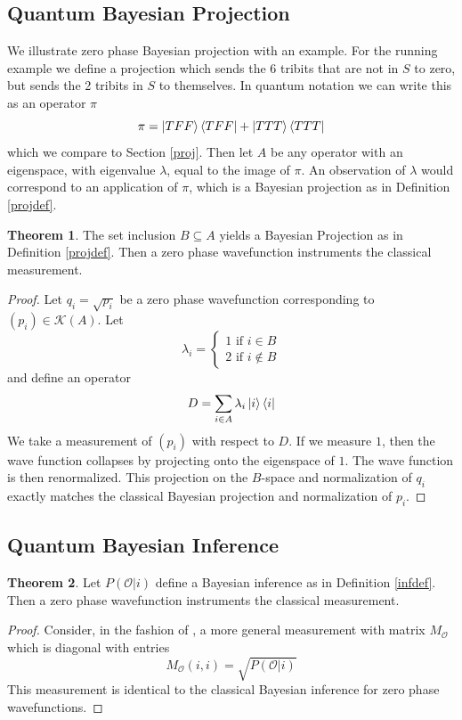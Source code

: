 \documentclass[12pt,a4paper]{article}
\theoremstyle{myrule}
\theoremstyle{postulate}
\theoremstyle{definition}
\newtheorem{theorem}{Theorem}[section]
\begin{document}
\subsection{Quantum Bayesian Projection}
We illustrate zero phase Bayesian projection with an example.  For the running example we define a projection which sends the 6 tribits that are not in $S$ to zero, but sends the 2 tribits in $S$ to themselves.  In quantum notation we can write this as an operator $\pi$ 
\[
\pi = \ket{TFF} \bra{TFF} + \ket{TTT} \bra{TTT}
\]
which we compare to Section \ref{proj}.  Then let $A$ be any operator with an eigenspace, with eigenvalue $\lambda$, equal to the image of $\pi$.  An observation of $\lambda$ would correspond to an application of $\pi$, which is a Bayesian projection as in Definition \ref{projdef}.
\begin{theorem}
  The set inclusion $B \subseteq A$ yields a Bayesian Projection as in Definition \ref{projdef}.  Then a zero phase wavefunction instruments the classical measurement.
\end{theorem}
\begin{proof}
Let $q_i = \sqrt{p_i}$ be a zero phase wavefunction corresponding to $(p_i) \in \mathcal{K}(A)$.  Let
  \[
  \lambda_i = \left\{ \begin{array}{ll} 1 \text{ if } i \in B \\ 2 \text{ if } i \not \in B \end{array} \right.
  \]
and define an operator
\[
  D = \sum_{i \in A} \lambda_i \ket{i} \bra{i}
\]
We take a measurement of $(p_i)$ with respect to $D$. If we measure $1$, then the wave function collapses by projecting onto the eigenspace of $1$. The wave function is then renormalized.  This projection on the $B$-space and normalization of $q_i$ exactly matches the classical Bayesian projection and normalization of $p_i$.
\end{proof}
\subsection{Quantum Bayesian Inference}
\begin{theorem}
  Let $P(\mathcal{O} | i)$ define a Bayesian inference as in Definition \ref{infdef}.  Then a zero phase wavefunction instruments the classical measurement.
\end{theorem}
\begin{proof}
Consider, in the fashion of \cite{nielsenchuang}, a more general measurement with matrix $M_\mathcal{O}$ which is diagonal with entries
\[
   M_\mathcal{O}(i,i) = \sqrt{P(\mathcal{O} | i)}
\]
This measurement is identical to the classical Bayesian inference for zero phase wavefunctions.
\end{proof}
\end{document}
